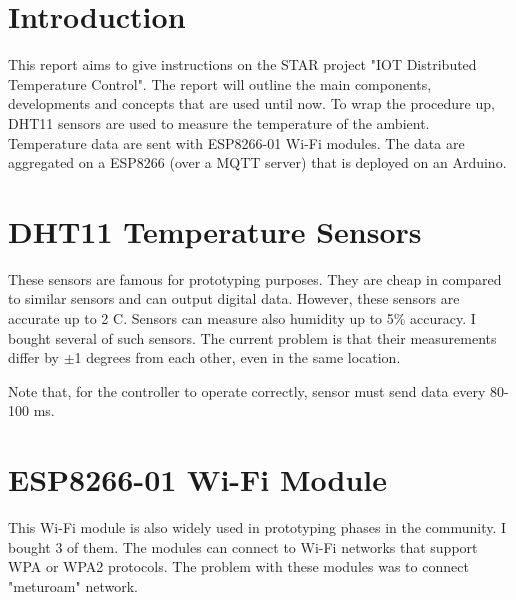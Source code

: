 \documentclass[a4paper,12pt]{article}
\begin{document}
	




\section{Introduction}
This report aims to give instructions on the STAR project "IOT Distributed Temperature Control". The report will outline the main components, developments and concepts that are used until now. To wrap the procedure up, DHT11 sensors are used to measure the temperature of the ambient. Temperature data are sent with ESP8266-01 Wi-Fi modules. The data are aggregated on a ESP8266 (over a MQTT server) that is deployed on an Arduino.
\section{DHT11 Temperature Sensors}
These sensors are famous for prototyping purposes. They are cheap in compared to similar sensors and can output digital data. However, these sensors \cite{ref-dht11} are accurate up to 2 \degree C. Sensors can measure also humidity up to 5\% accuracy. I bought several of such sensors. The current problem is that their measurements differ by $\pm$1 degrees from each other, even in the same location.

Note that, for the controller to operate correctly, sensor must send data every 80-100 ms.

\section{ESP8266-01 Wi-Fi Module}
This Wi-Fi module is also widely used in prototyping phases in the community. I bought 3 of them. The modules can connect to Wi-Fi networks that support WPA or WPA2 protocols. The problem with these modules was to connect "meturoam" network. 
\end{document}
